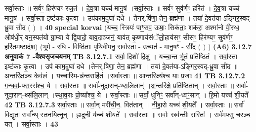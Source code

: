 \documentclass[17pt]{extarticle}
\begin{document}
{{{{{{{{{{{{{{{{{{{{{{{                  सर्वा॒स्ताः ॥ सर्वꣳ॒॒ हिर॑ण्यꣳ रज॒तं । दे॒व॒त्रा यच्च॑ मानु॒षं ।सर्वा॒स्ताः ॥ सर्वꣳ॒॒ सुव॑र्णꣳ॒॒ हरि॑तं । दे॒व॒त्रा यच्च॑ मानु॒षं । सर्वा॒स्ता इष्ट॑काः कृ॒त्वा । उप॑काम॒दुघा॑ दधे । तेनर्.षि॑णा॒ तेन॒ ब्रह्म॑णा । तया॑ दे॒वत॑या-ऽङ्गिर॒स्वद्-ध्रु॒वा सी॑द ( ) । \textbf{ 40} \newline
                  \newline
                                                        \textbf{special korvai} \newline
              (यच्च॒ स्त्रियः॑ पाꣳ॒॒सव॒ ऊषाः॒ सिक॑ताः॒ शर्क॑रा॒ अश्मा॑नो वी॒रुध॒ ओष॑धी॒र् वन॒स्पत॑यो ग्रा॒म्या ये द्वि॒पादो॒ याव॒दाञ्ज॑नं॒ याव॑त् कृ॒ष्णाय॑संॅलो॒हाय॑सꣳ॒॒ सीसꣳ॒॒ हिर॑ण्यꣳ॒॒ सुव॑र्णꣳ॒॒ हरि॑तम॒ष्टाद॑श) \newline
                                (भूमे॒ - रधि॒ - विष्ठि॑ताः पृथि॒वीमनु॒ सर्वा॒स्ता - उ॒च्यत॑ - मानु॒षꣳ - सी॑द ( ) ) \textbf{(A6)} \newline \newline
                \textbf{ 3.12.7    अनुवाकं   7 -वैश्वसृजचयनम्} \newline
                                \textbf{ TB 3.12.7.1} \newline
                  सर्वा॒ दिशो॑ दि॒क्षु । यच्चा॒न्त र्भू॒तं प्रति॑ष्ठितं । सर्वा॒स्ता इष्ट॑काः कृ॒त्वा । उप॑ काम॒दुघा॑ दधे ।तेनर्.षि॑णा॒ तेन॒ ब्रह्म॑णा । तया॑ दे॒वत॑या-ऽङ्गिर॒स्वद्-ध्रु॒वा सी॑द ॥अ॒न्तरि॑क्षञ्च॒ केव॑लं । यच्चा॒स्मि-न्न॑न्त॒राहि॑तं ।सर्वा॒स्ताः ॥ आ॒न्त॒रि॒क्ष्य॑श्च॒ याः प्र॒जाः \textbf{ 41} \newline
                  \newline
                                \textbf{ TB 3.12.7.2} \newline
                  ग॒न्ध॒र्वा॒॒-फ्स॒रस॑श्च॒ ये । सर्वा॒स्ताः ॥ सर्वा॑-नुदा॒रान्-थ्स॒लिलान्॑ ।अ॒न्तरि॑क्षे॒ प्रति॑ष्ठितान् । सर्वा॒स्ताः ॥ सर्वा॑-नुदा॒रान्-थ्स॑लि॒लान् ।स्था॒व॒राः प्रो॒ष्या᳚श्च॒ ये । सर्वा॒स्ताः ॥ सर्वां॒ धुनिꣳ॒॒ सर्वा᳚न्-ध्वꣳ॒॒सान् । हि॒मो यच्च॑ शी॒यते᳚ \textbf{ 42} \newline
                  \newline
                                \textbf{ TB 3.12.7.3} \newline
                  सर्वा॒स्ताः ॥ सर्वा॒न् मरी॑ची॒न॒. वित॑तान् । नी॒हा॒रो यच्च॑ शी॒यते᳚ । सर्वा॒स्ताः ॥ सर्वा॑ वि॒द्युतः॒ सर्वा᳚न्थ् स्तनयि॒त्नून् । ह्रा॒दुनी॒ र्यच्च॑ शी॒यते᳚ । सर्वा॒स्ताः ॥ सर्वाः॒ स्रव॑न्तीः स॒रितः॑ । सर्व॑मफ्सु च॒रञ्च॒ यत् । सर्वा॒स्ताः । \textbf{ 43} \newline
                  \newline
}}}}}}}}}}}}}}}}}}}}}}}
\end{document}
